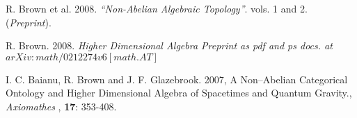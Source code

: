 \documentclass[12pt]{article}
\theoremstyle{plain}
\theoremstyle{definition}
\numberwithin{equation}{section}
\begin{document}
\begin{thebibliography}{9}

R. Brown et al. 2008. {\em ``Non-Abelian Algebraic Topology''}. vols. 1 and 2. ({\em Preprint}).

R. Brown. 2008. {\em Higher Dimensional Algebra Preprint as pdf and ps docs. at $arXiv:math/0212274v6 [math.AT]$}

I. C. Baianu, R. Brown and J. F. Glazebrook. 2007,  A Non--Abelian Categorical Ontology and Higher Dimensional Algebra of Spacetimes and Quantum Gravity., {\em Axiomathes }, \textbf{17}: 353-408. 


\end{thebibliography}
\end{document}
